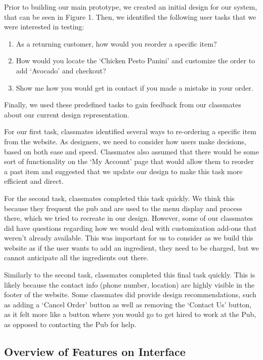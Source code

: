 \documentclass[runningheads]{llncs}
\begin{document}
Prior to building our main prototype, we created an initial design for our system, that can be seen in Figure 1. Then, we identified the following user tasks that we were interested in testing: 
\begin{enumerate}
    \item As a returning customer, how would you reorder a specific item?
    \item How would you locate the ‘Chicken Pesto Panini’ and customize the order to add ‘Avocado’ and checkout? 
    \item Show me how you would get in contact if you made a mistake in your order. 
\end{enumerate}
Finally, we used these predefined tasks to gain feedback from our classmates about our current design representation. 

For our first task, classmates identified several ways to re-ordering a specific item from the website. As designers, we need to consider how users make decisions, based on both ease and speed. Classmates also assumed that there would be some sort of functionality on the ‘My Account’ page that would allow them to reorder a past item and suggested that we update our design to make this task more efficient and direct. 

For the second task, classmates completed this task quickly. We think this because they frequent the pub and are used to the menu display and process there, which we tried to recreate in our design. However, some of our classmates did have questions regarding how we would deal with customization add-ons that weren’t already available. This was important for us to consider as we build this website as if the user wants to add an ingredient, they need to be charged, but we cannot anticipate all the ingredients out there. 

Similarly to the second task, classmates completed this final task quickly. This is likely because the contact info (phone number, location) are highly visible in the footer of the website. Some classmates did provide design recommendations, such as adding a ‘Cancel Order’ button as well as removing the ‘Contact Us’ button, as it felt more like a button where you would go to get hired to work at the Pub, as opposed to contacting the Pub for help. 

\subsection{Overview of Features on Interface}  
\end{document}
